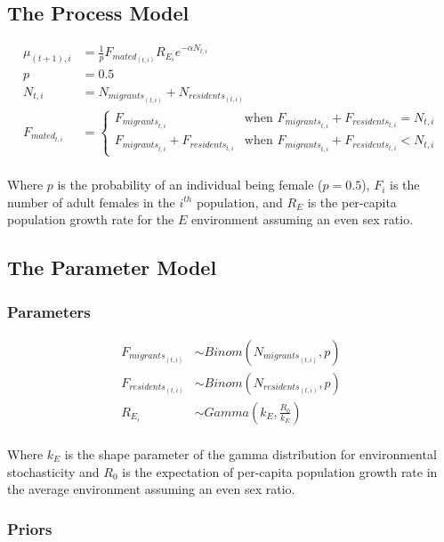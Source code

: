 \documentclass{article}[12pt]
\begin{document}
\subsection*{The Process Model}

\begin{align*}
\mu_{(t + 1), i} & = \frac{1}{p}F_{{mated}_{(t, i)}}R_{E_i}e^{-\alpha N_{t, i}} \\
p & = 0.5 \\
N_{t, i} & = N_{{migrants}_{(t, i)}} + N_{{residents}_{(t, i)}} \\
F_{{mated}_{t,i}} & = \begin{cases}
	F_{{migrants}_{t, i}} & \text{when } F_{{migrants}_{t, i}} + F_{{residents}_{t,i}} = N_{t, i}  \\
	F_{{migrants}_{t, i}} + F_{{residents}_{t,i}} & \text{when } F_{{migrants}_{t, i}} + F_{{residents}_{t,i}} < N_{t, i}
	\end{cases} \\
\end{align*}

Where $p$ is the probability of an individual being female ($p=0.5$), $F_i$ is the number of adult females in the $i^{th}$ population, and $R_E$ is the per-capita population growth rate for the $E$ environment assuming an even sex ratio.

\subsection*{The Parameter Model}

\subsubsection*{Parameters}

\begin{align*}
F_{{migrants}_{(t, i)}} & \sim Binom(N_{{migrants}_{(t, i)}}, p) \\
F_{{residents}_{(t, i)}} & \sim Binom(N_{{residents}_{(t, i)}}, p) \\
R_{E_i} & \sim Gamma(k_E, \frac{R_0}{k_E}) \\
\end{align*}

Where $k_E$ is the shape parameter of the gamma distribution for environmental stochasticity and $R_0$ is the expectation of per-capita population growth rate in the average environment assuming an even sex ratio.

\subsubsection*{Priors}
\end{document}
